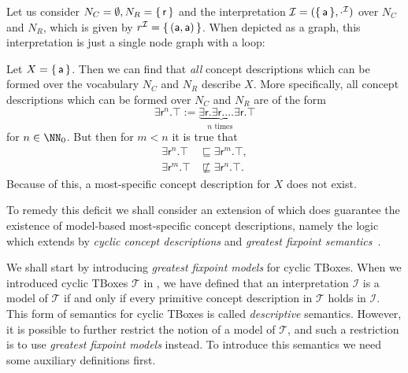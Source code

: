 \begin{Example}
  \label{expl:mmscs-may-not-exist-in-ELbot}
  Let us consider $N_C = \emptyset, N_R = {\{\, \mathsf{r} \,\}}$ and the interpretation
  $\mathcal{I} = ({\{\,\mathsf{a}\,\}}, \cdot^{\mathcal{I}})$ over $N_C$ and $N_R$, which is
  given by $r^{\mathcal{I}} = {\{\, (\mathsf{a}, \mathsf{a}) \,\}}$.  When depicted as a
  graph, this interpretation is just a single node graph with a loop:
  \begin{center}
  \end{center}
  Let $X = {\{\, \mathsf{a} \,\}}$.  Then we can find that \emph{all} \EL concept descriptions
  which can be formed over the vocabulary $N_C$ and $N_R$ describe $X$.  More
  specifically, all \EL concept descriptions which can be formed over $N_C$ and $N_R$ are
  of the form
  \begin{equation*}
    \exists \mathsf{r}^n. \top := \underbrace{\exists \mathsf{r}. \exists \mathsf{r}. \dots \exists
      \mathsf{r}}_{n \text{ times }}. \top
  \end{equation*}
  for $n \in \NN_0$.  But then for $m < n$ it is true that
  \begin{align*}
    \exists \mathsf{r}^{n}. \top &\sqsubseteq \exists \mathsf{r}^m. \top, \\
    \exists \mathsf{r}^{m}. \top &\not\sqsubseteq \exists \mathsf{r}^n. \top.
  \end{align*}
  Because of this, a most-specific concept description for $X$ does not exist.
\end{Example}

To remedy this deficit we shall consider an extension of \ELbot which does guarantee the
existence of model-based most-specific concept descriptions, namely the logic \ELgfpbot
which extends \ELbot by \emph{cyclic concept descriptions} and \emph{greatest fixpoint
  semantics}~\cite{DBLP:conf/ijcai/Baader03a,sowa/Nebel91}.

We shall start by introducing \emph{greatest fixpoint models} for cyclic TBoxes.  When we
introduced cyclic TBoxes $\mathcal{T}$ in
, we have defined that an
interpretation $\mathcal{I}$ is a model of $\mathcal{T}$ if and only if every primitive
concept description in $\mathcal{T}$ holds in $\mathcal{I}$.  This form of semantics for
cyclic TBoxes is called \emph{descriptive} semantics.  However, it is possible to further
restrict the notion of a model of $\mathcal{T}$, and such a restriction is to use
\emph{greatest fixpoint models} instead.  To introduce this semantics we need some
auxiliary definitions first.

